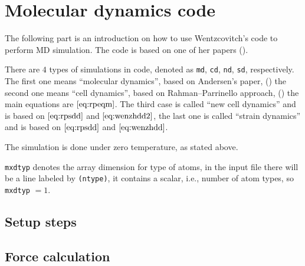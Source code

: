 
\section{Molecular dynamics code}
\label{sec:mdc}

The following part is an introduction on how to use
Wentzcovitch's code to perform MD simulation. The code is
based on one of her papers (\cite{Wentzcovitch:1991ka}).

There are $4$ types of simulations in code,
denoted as \texttt{md}, \texttt{cd}, \texttt{nd}, \texttt{sd},
respectively. The first one means ``molecular dynamics'',
based on Andersen's paper, (\cite{Andersen:1980ew})
the second one means ``cell dynamics'', based on
Rahman–Parrinello approach, (\cite{Parrinello:1980kx})
the main equations are $\eqref{eq:rpeqm}$.
The third case is called ``new cell dynamics'' and is based on
$\eqref{eq:rpsdd}$ and $\eqref{eq:wenzhdd2}$,
the last one is called ``strain dynamics'' and is based on
$\eqref{eq:rpsdd}$ and $\eqref{eq:wenzhdd}$.

The simulation is done under zero temperature, as stated above.

\texttt{mxdtyp} denotes the array dimension for type of atoms,
in the input file there will be a line labeled by \texttt{(ntype)}, it
contains a scalar, i.e., number of atom types, so \texttt{mxdtyp} $=1$.



\subsection{Setup steps}











\subsection{Force calculation}








